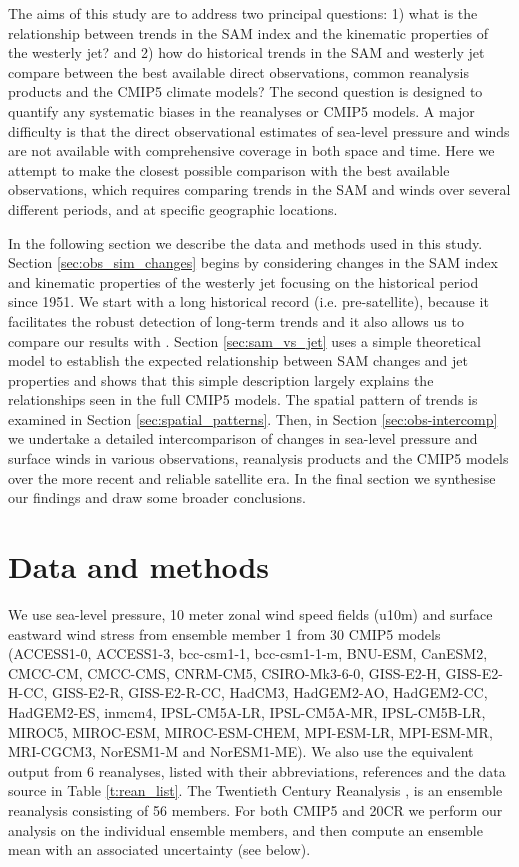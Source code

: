 \documentclass{ametsoc}
\begin{document}
The aims of this study are to address two principal questions: 1) what is the relationship  between trends 
in the SAM index and the kinematic properties of the westerly jet? and 2) how do
historical trends in the SAM and westerly jet compare between the best available direct observations,
common reanalysis products and the CMIP5 climate models? The second question is designed to quantify 
any systematic biases in the reanalyses or CMIP5 models. A major difficulty is that the direct observational
estimates of sea-level pressure and winds are not available with comprehensive coverage in both space and time. 
Here we attempt to make the closest possible comparison with the best available observations, which requires
comparing trends in the SAM and winds over several different periods, and at specific geographic locations.

In the following section we describe the data and methods used in this study. Section \ref{sec:obs_sim_changes} 
begins  by considering changes in the SAM index and kinematic properties of the westerly jet 
focusing on the historical period since 1951. We start with a long historical record (i.e. pre-satellite),
because it facilitates the robust detection of long-term trends and it also allows us to compare our results with 
\cite{Gillett_and_Fyfe_2013}. Section \ref{sec:sam_vs_jet} uses a simple theoretical model to 
establish the expected relationship between SAM changes and jet properties and  shows that this simple 
description largely explains the relationships seen in the full CMIP5 models. The spatial pattern of trends
is examined in Section \ref{sec:spatial_patterns}. Then, in Section \ref{sec:obs-intercomp} we
undertake a detailed intercomparison of changes in sea-level pressure and surface winds in various observations,
reanalysis products and the CMIP5 models over the more recent and reliable satellite era. In the final section
we synthesise our findings and draw some broader conclusions.

\section{Data and methods} \label{sec:data_and_methods}
We use sea-level pressure, 10 meter zonal wind speed fields (u10m) and surface eastward wind stress
from ensemble member 1 from 30 CMIP5 models 
(ACCESS1-0, ACCESS1-3, bcc-csm1-1, bcc-csm1-1-m, BNU-ESM,
CanESM2, CMCC-CM, CMCC-CMS, CNRM-CM5, CSIRO-Mk3-6-0, GISS-E2-H, GISS-E2-H-CC, GISS-E2-R, 
GISS-E2-R-CC, HadCM3, HadGEM2-AO, HadGEM2-CC, HadGEM2-ES, inmcm4, IPSL-CM5A-LR, IPSL-CM5A-MR,
IPSL-CM5B-LR, MIROC5, MIROC-ESM, MIROC-ESM-CHEM, MPI-ESM-LR, MPI-ESM-MR, MRI-CGCM3, 
NorESM1-M and NorESM1-ME). We also use the equivalent output from 6 reanalyses, listed with 
their abbreviations, references and the data source in Table \ref{t:rean_list}. The 
Twentieth Century Reanalysis \citep[20CR;][]{Compo_et_al_2011}, is an ensemble reanalysis
consisting of 56 members. For both CMIP5 and 20CR we perform our analysis on the 
individual ensemble members, and then compute an ensemble mean with an associated uncertainty
(see below).
\end{document}
